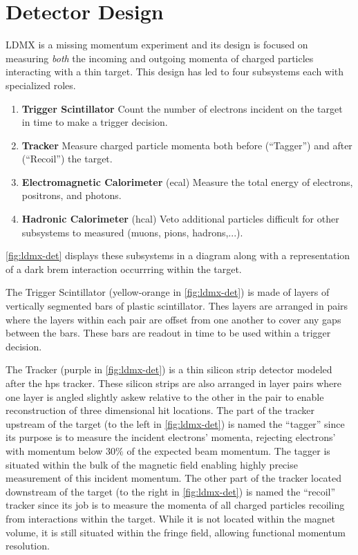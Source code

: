 \section{Detector Design}
LDMX is a missing momentum experiment and its design is focused on measuring
\emph{both} the incoming and outgoing momenta of charged particles interacting
with a thin target.
This design has led to four subsystems each with specialized roles.
\begin{enumerate}
    \item \textbf{Trigger Scintillator} Count the number of electrons incident on the target in time to make a trigger decision.
    \item \textbf{Tracker} Measure charged particle momenta both before (``Tagger'') and after (``Recoil'') the target.
    \item \textbf{Electromagnetic Calorimeter} (\gls{ecal}) Measure the total energy of electrons, positrons, and photons.
    \item \textbf{Hadronic Calorimeter} (\gls{hcal}) Veto additional particles difficult for other subsystems to measured (muons, pions, hadrons,...).
\end{enumerate}
\cref{fig:ldmx-det} displays these subsystems in a diagram along with a representation of
a dark brem interaction occurrring within the target.

The Trigger Scintillator (yellow-orange in \cref{fig:ldmx-det}) is made of layers of vertically segmented bars of plastic
scintillator. Thes layers are arranged in pairs where the layers within each pair are offset from one
another to cover any gaps between the bars. These bars are readout in time to be used within
a trigger decision.

The Tracker (purple in \cref{fig:ldmx-det}) is a thin silicon strip detector modeled after
the \gls{hps} tracker. These silicon strips are also arranged in layer pairs where one layer
is angled slightly askew relative to the other in the pair to enable reconstruction of three
dimensional hit locations. The part of the tracker upstream of the target (to the left in \cref{fig:ldmx-det})
is named the ``tagger'' since its purpose is to measure the incident electrons' momenta,
rejecting electrons' with momentum below $30\%$ of the expected beam momentum. The tagger
is situated within the bulk of the magnetic field enabling highly precise measurement of
this incident momentum. The other part of the tracker located downstream of the target
(to the right in \cref{fig:ldmx-det}) is named the ``recoil'' tracker since its job is
to measure the momenta of all charged particles recoiling from interactions within the
target. While it is not located within the magnet volume, it is still situated within
the fringe field, allowing functional momentum resolution.


